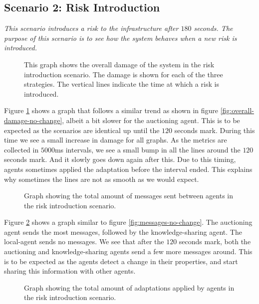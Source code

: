 \subsection{Scenario 2: Risk Introduction}
\label{ssec:scenario-2-results}
\textit{This scenario introduces a risk to the infrastructure after $180$ seconds. The purpose of this scenario is to see how the system behaves when a new risk is introduced.}

\begin{figure}[H]
    \centering
    
    \caption{This graph shows the overall damage of the system in the risk introduction scenario. The damage is shown for each of the three strategies. The vertical lines indicate the time at which a risk is introduced.}
    \label{fig:overall-damage-inroduce-risk}
\end{figure}

Figure \ref{fig:overall-damage-inroduce-risk} shows a graph that follows a similar trend as shown in figure \ref{fig:overall-damage-no-change}, albeit a bit slower for the auctioning agent. This is to be expected as the scenarios are identical up until the $120$ seconds mark. During this time we see a small increase in damage for all graphs. As the metrics are collected in $5000$ms intervals, we see a small bump in all the lines around the $120$ seconds mark. And it slowly goes down again after this. Due to this timing, agents sometimes applied the adaptation before the interval ended. This explains why sometimes the lines are not as smooth as we would expect.

\begin{figure}[H]
    \centering
    
    \caption{Graph showing the total amount of messages sent between agents in the risk introduction scenario.}
    \label{fig:messages-risk-introduction}
\end{figure}

Figure \ref{fig:messages-risk-introduction} shows a graph similar to figure \ref{fig:messages-no-change}. The auctioning agent sends the most messages, followed by the knowledge-sharing agent. The local-agent sends no messages. We see that after the $120$ seconds mark, both the auctioning and knowledge-sharing agents send a few more messages around. This is to be expected as the agents detect a change in their properties, and start sharing this information with other agents.

\begin{figure}[H]
    \centering
    
    \caption{Graph showing the total amount of adaptations applied by agents in the risk introduction scenario.}
    \label{fig:proposals-risk-introduction}
\end{figure}

